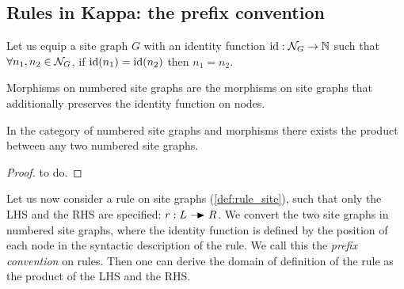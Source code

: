 \subsection{Rules in Kappa: the prefix convention}
\label{app:prefix_convention}

\begin{definition}
  Let us equip a site graph $G$ with an identity function $\text{id}:\mathcal{N}_G\to \mathbb{N}$ such that $\forall n_1, n_2\in\mathcal{N}_G$, if $\text{id}(n_1)=\text{id}(n_2)$ then $n_1 = n_2$.

  Morphisms on numbered site graphs are the morphisms on site graphs that additionally preserves the identity function on nodes.
\end{definition}

\begin{lemma}
  In the category of numbered site graphs and morphisms there exists the product between any two numbered site graphs.
\end{lemma}
\begin{proof}
  to do.
\end{proof}

Let us now consider a rule on site graphs (\autoref{def:rule_site}), such that only the LHS and the RHS are specified: $r:L\action R$. We convert the two site graphs in numbered site graphs, where the identity function is defined by the position of each node in the syntactic description of the rule. We call this the \emph{prefix convention} on rules. Then one can derive the domain of definition of the rule as the product of the LHS and the RHS.

